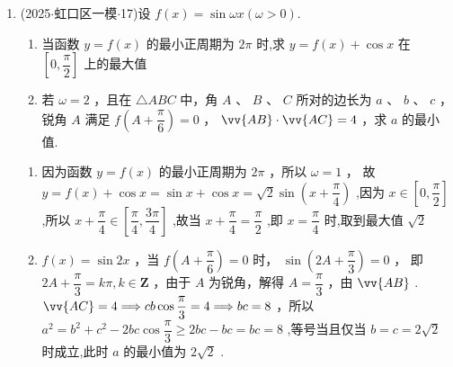 \begin{enumerate}
    \item (2025$\cdot$虹口区一模$\cdot$17)设 $f\left( x\right)  = \sin {\omega x}\left( {\omega  > 0}\right)$.
    \begin{enumerate}
        \item 当函数 $y = f\left( x\right)$ 的最小正周期为 ${2\pi }$ 时,求 $y = f\left( x\right)  + \cos x$ 在 $\left\lbrack  {0,\dfrac{\pi }{2}}\right\rbrack$ 上的最大值
        \item 若 $\omega  = 2$ ，且在 $\bigtriangleup  {ABC}$ 中，角 $A$ 、 $B$ 、 $C$ 所对的边长为 $a$ 、 $b$ 、 $c$ ，锐角 $A$ 满足 $f\left( {A + \dfrac{\pi }{6}}\right)  = 0$ ， $\vv{AB} \cdot  \vv{AC} = 4$ ，求 $a$ 的最小值.
    \end{enumerate}
    \begin{jieda}
        \begin{enumerate}
            \item 因为函数 $y = f\left( x\right)$ 的最小正周期为 ${2\pi }$ ，所以 $\omega  = 1$ ， 故 $y = f\left( x\right)  + \cos x = \sin x + \cos x = \sqrt{2}\sin \left( {x + \dfrac{\pi }{4}}\right)$ ,因为 $x \in  \left\lbrack  {0,\dfrac{\pi }{2}}\right\rbrack$ ,所以 $x + \dfrac{\pi }{4} \in  \left\lbrack  {\dfrac{\pi }{4},\dfrac{3\pi }{4}}\right\rbrack$ ,故当 $x + \dfrac{\pi }{4} = \dfrac{\pi }{2}$ ,即 $x = \dfrac{\pi }{4}$ 时,取到最大值 $\sqrt{2}$
            \item $f\left( x\right)  = \sin {2x}$ ，当 $f\left( {A + \dfrac{\pi }{6}}\right)  = 0$ 时， $\sin \left( {{2A} + \dfrac{\pi }{3}}\right)  = 0$ ， 即 ${2A} + \dfrac{\pi }{3} = {k\pi },k \in  \mathbf{Z}$ ，由于 $A$ 为锐角，解得 $A = \dfrac{\pi }{3}$ ，由 $\vv{AB}$ . $\vv{AC} = 4 \Longrightarrow  {cb}\cos \dfrac{\pi }{3} = 4 \Longrightarrow  {bc} = 8$ ，所以 ${a}^{2} = {b}^{2} + {c}^{2} - {2bc}\cos \dfrac{\pi }{3} \geq  {2bc} - {bc} = {bc} = 8$ ,等号当且仅当 $b = c = 2\sqrt{2}$ 时成立,此时 $a$ 的最小值为 $2\sqrt{2}$ .
        \end{enumerate}
    \end{jieda}


\end{enumerate}
